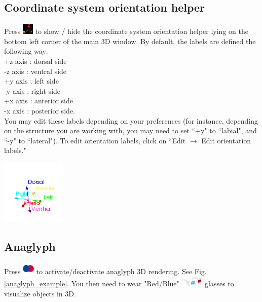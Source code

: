 \subsection{Coordinate system orientation helper}
\begin{minipage}{0.7\textwidth}
Press \includegraphics[scale=0.7]{images/06/display/orientation_helper.png} to show / hide the coordinate system orientation helper lying on the bottom left corner of the main 3D window. By default, the labels are defined
the following way:\\
+z axis : dorsal side\\
-z axis : ventral side\\
+y axis : left side\\
-y axis : right side\\
+x axis : anterior side\\
-x axis : posterior side.\\
You may edit these labels depending on your preferences (for instance,
depending on the structure you are working with, you may need to set ``+y" to ``labial", and ``-y" to
``lateral"). To edit orientation labels, click on ``Edit $\rightarrow$ Edit orientation labels."
\end{minipage}    
\begin{minipage}{0.3\textwidth}\centering
 \includegraphics[scale=0.7]{images/06/camera/orientation_helper_view.png}
 \end{minipage}   


\subsection{Anaglyph}
Press \includegraphics[scale=0.7]{images/06/display/anaglyph.png} to activate/deactivate anaglyph 3D rendering.
See Fig. \ref{anaglyph_example}. You then need to wear "Red/Blue" \includegraphics[scale=0.7]{images/06/display/anaglyph_glasses.png} glasses to visualize objects in 3D.

